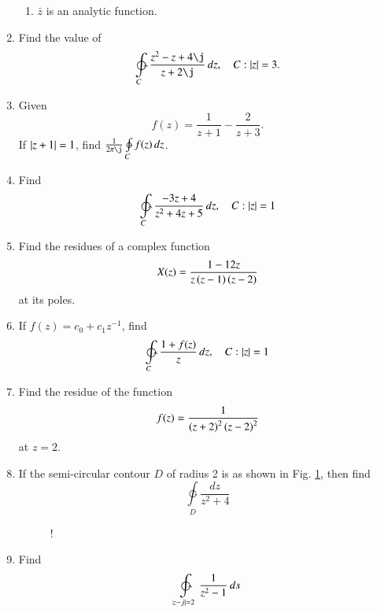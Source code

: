 \documentclass[journal,12pt,twocolumn]{IEEEtran}
\begin{document}
\begin{enumerate}[1.]
\begin{enumerate}
\item $\bar{z}$ is an analytic function.
\end{enumerate}
\item Find the value of 
\begin{equation}
\ointctrclockwise\limits_{C}\frac{z^2-z+4\j}{z+2\j}\,dz, \quad C:\abs{z} = 3.
\end{equation}
\item Given 
\begin{equation}
f(z) = \frac{1}{z+1}-\frac{2}{z+3}.
\end{equation}
%
If $\left\vert z+1\right\vert = 1 $, find $\frac{1}{2\pi\j}\ointctrclockwise\limits_{C}f(z)\,dz$.
\item Find 
\begin{equation}
\ointctrclockwise\limits_{C}\frac{-3z+4}{z^2+4z+5}\,dz, \quad C:\abs{z} = 1
\end{equation}
\item Find the residues of a complex function 
\begin{equation}
X(z) = \frac{1-12z}{z\left(z-1\right)\left(z-2\right)}
\end{equation}
at its poles.
\item If $f(z) = c_0+c_1z^{-1}$, find
\begin{equation}
\ointctrclockwise\limits_{C}\frac{1+f(z)}{z}\,dz, \quad C: \abs{z} = 1
\end{equation} 
\item Find the residue of the function
\begin{equation}
f(z) = \frac{1}{\left(z+2\right)^2\left(z-2\right)^2}
\end{equation}
at $z = 2$.
\item If the semi-circular contour $D$ of radius 2 is as shown in Fig. \ref{fig:ec2007}, then find
\begin{equation}
\ointctrclockwise\limits_{D}\frac{dz}{z^2+4}
\end{equation}

\begin{figure}[!h]
\centering
\resizebox {\columnwidth} {!} {

}
\caption{}
\label{fig:ec2007}
\end{figure}

\item Find
\begin{equation}
\ointctrclockwise\limits_{\abs{z-j}=2}\frac{1}{z^2-1}\,ds
\end{equation}


\end{enumerate}
\end{document}
